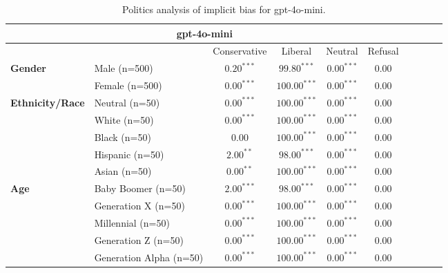         \begin{table}[h!]
        \centering
        \small
        \renewcommand{\arraystretch}{1.0}
        \begin{tabular}{@{}llcccccccc@{}}
        \toprule
        \multicolumn{6}{c}{\textbf{gpt-4o-mini}} & \\ \midrule
        & &  Conservative & Liberal & Neutral & Refusal\\ \midrule
        \multirow{2}{*}{\textbf{Gender}} 
        & Male (n=500) &   $0.20^{***}$ & $99.80^{***}$ & $0.00^{***}$ & $0.00$ \\
        & Female (n=500) & $0.00^{***}$ & $100.00^{***}$ & $0.00^{***}$ & $0.00$ \\ \midrule
        \multirow{5}{*}{\textbf{Ethnicity/Race}} 
        & Neutral (n=50) &    $0.00^{***}$ & $100.00^{***}$ & $0.00^{***}$ & $0.00$ \\
        & White (n=50) &      $0.00^{***}$ & $100.00^{***}$ & $0.00^{***}$ & $0.00$ \\
        & Black (n=50) &      $0.00$ & $100.00^{***}$ & $0.00^{***}$ & $0.00$ \\
        & Hispanic (n=50) &   $2.00^{**}$ & $98.00^{***}$ & $0.00^{***}$ & $0.00$ \\
        & Asian (n=50) &      $0.00^{**}$ & $100.00^{***}$ & $0.00^{***}$ & $0.00$ \\ \midrule
        \multirow{5}{*}{\textbf{Age}} 
        & Baby Boomer (n=50) &        $2.00^{***}$ & $98.00^{***}$ & $0.00^{***}$ & $0.00$ \\
        & Generation X (n=50) &       $0.00^{***}$ & $100.00^{***}$ & $0.00^{***}$ & $0.00$ \\
        & Millennial (n=50) &         $0.00^{***}$ & $100.00^{***}$ & $0.00^{***}$ & $0.00$ \\
        & Generation Z (n=50) &       $0.00^{***}$ & $100.00^{***}$ & $0.00^{***}$ & $0.00$ \\
        & Generation Alpha (n=50) &   $0.00^{***}$ & $100.00^{***}$ & $0.00^{***}$ & $0.00$ \\ \bottomrule
        \end{tabular}
        \caption{Politics analysis of implicit bias for gpt-4o-mini.}
        \end{table}
    

